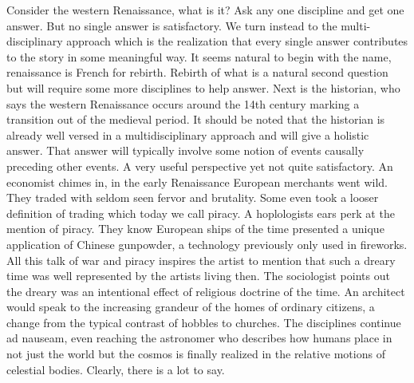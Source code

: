 \documentclass[a4paper, 12pt]{article}
\begin{document}
Consider the western Renaissance, what is it? Ask any one discipline and get one answer. But no single answer is satisfactory. We turn instead to the multi-disciplinary approach which is the realization that every single answer contributes to the story in some meaningful way. It seems natural to begin with the name, renaissance is French for rebirth. Rebirth of what is a natural second question but will require some more disciplines to help answer. Next is the historian, who says the western Renaissance occurs around the 14th century marking a transition out of the medieval period. It should be noted that the historian is already well versed in a multidisciplinary approach and will give a holistic answer. That answer will typically involve some notion of events causally preceding other events. A very useful perspective yet not quite satisfactory. An economist chimes in, in the early Renaissance European merchants went wild. They traded with seldom seen fervor and brutality. Some even took a looser definition of trading which today we call piracy. A hoplologists ears perk at the mention of piracy. They know European ships of the time presented a unique application of Chinese gunpowder, a technology previously only used in fireworks. All this talk of war and piracy inspires the artist to mention that such a dreary time was well represented by the artists living then. The sociologist points out the dreary was an intentional effect of religious doctrine of the time. An architect would speak to the increasing grandeur of the homes of ordinary citizens, a change from the typical contrast of hobbles to churches. The disciplines continue ad nauseam, even reaching the astronomer who describes how humans place in not just the world but the cosmos is finally realized in the relative motions of celestial bodies. Clearly, there is a lot to say.
\end{document}
